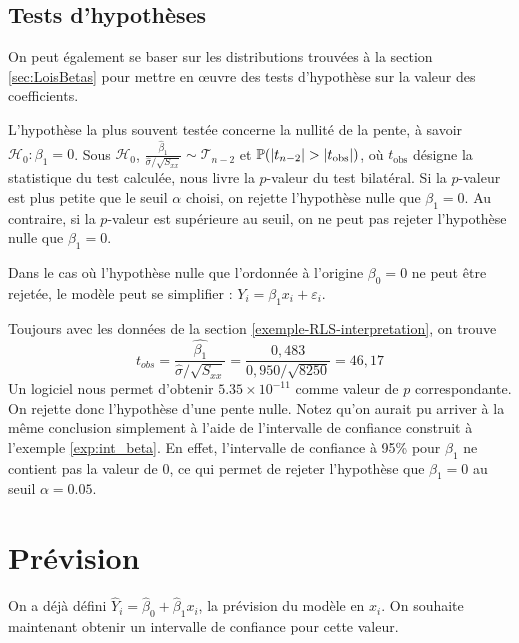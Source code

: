 \newpage
\subsection{Tests d'hypothèses}

On peut également se baser sur les distributions trouvées à la section \ref{sec:LoisBetas}
pour mettre en {\oe}uvre des tests d'hypothèse sur la valeur des coefficients.

L'hypothèse la plus souvent testée concerne la nullité de la pente, à savoir $\mathcal{H}_0: \beta_1 = 0$. Sous $\mathcal{H}_0$, $\frac{\hat{\beta}_1}{\hat\sigma/\sqrt{S_{xx}}} \sim \mathcal{T}_{n-2}$ et $\prob(|t_{n-2}|>|t_{\text{obs}}|)$, où $t_{\text{obs}}$ désigne la statistique du test calculée, nous livre la $p$-valeur du test bilatéral. Si la $p$-valeur est plus petite que le seuil $\alpha$ choisi, on rejette l'hypothèse nulle que $\beta_1=0$. Au contraire, si la $p$-valeur est supérieure au seuil, on ne peut pas rejeter l'hypothèse nulle que $\beta_1=0$.


 Dans le cas où l'hypothèse nulle que l'ordonnée à l'origine $\beta_0=0$ ne peut être rejetée, le modèle peut se simplifier :  $Y_i = \beta_1 x_i + \varepsilon_i$.

\begin{exemple}
Toujours avec les données de la section \ref{exemple-RLS-interpretation}, on trouve
$$ t_{obs} = \frac{\hat{\beta_1}}{\hat\sigma/\sqrt{S_{xx}}} = \frac{0,483}{0,950/\sqrt{8250}} = 46,17 $$
Un logiciel nous permet d'obtenir $5.35 \times 10^{-11}$ comme valeur de $p$ correspondante. On rejette donc l'hypothèse d'une pente nulle. Notez qu'on aurait pu arriver à la même conclusion simplement à l'aide de l'intervalle de confiance construit à l'exemple \ref{exp:int_beta}. En effet, l'intervalle de confiance à 95\% pour $\beta_1$ ne contient pas la valeur de $0$, ce qui permet de rejeter l'hypothèse que $\beta_1 = 0$ au seuil $\alpha = 0.05$.

\end{exemple}


\section{Prévision}
\label{sec:PrévisionRLS}

On a déjà défini $\hat{Y}_i = \hat{\beta}_0 + \hat{\beta}_1 x_i$, la prévision du modèle en $x_i$. On souhaite maintenant obtenir un intervalle de confiance pour cette valeur.

